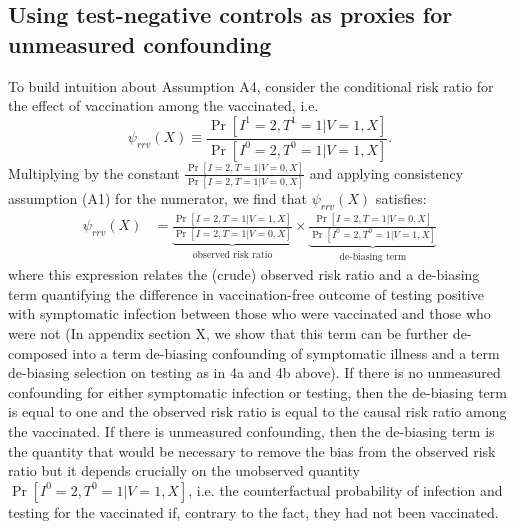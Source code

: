 \documentclass[11pt]{article}
\begin{document}
\subsection{Using test-negative controls as proxies for unmeasured confounding} \label{sec:effect_among_vaccinated}
To build intuition about Assumption A4, consider the conditional risk ratio for the effect of vaccination among the vaccinated, i.e.
\begin{equation*}
    \psi_{rrv}(X) \equiv \frac{\Pr[I^1 = 2, T^1 = 1 | V = 1, X]}{\Pr[I^0 = 2, T^0 = 1 | V = 1, X]}.
\end{equation*}
Multiplying by the constant $\frac{\Pr[I = 2, T = 1 | V = 0, X]}{\Pr[I = 2, T = 1 | V = 0, X]}$ and applying consistency assumption (A1) for the numerator, we find that $\psi_{rrv}(X)$ satisfies:
\begin{align*}
    \psi_{rrv}(X) &=\underbrace{\frac{\Pr[I = 2, T = 1 | V = 1, X]}{\Pr[I = 2, T = 1 | V = 0, X]}}_{\text{observed risk ratio}} \times \underbrace{\frac{\Pr[I = 2, T = 1 | V = 0, X]}{\Pr[I^0 = 2, T^0 = 1 | V = 1, X]}}_{\text{de-biasing term}} 
\end{align*}
where this expression relates the (crude) observed risk ratio and a de-biasing term quantifying the difference in vaccination-free outcome of testing positive with symptomatic infection between those who were vaccinated and those who were not (In appendix section X, we show that this term can be further de-composed into a term de-biasing confounding of symptomatic illness and a term de-biasing selection on testing as in 4a and 4b above). If there is no unmeasured confounding for either symptomatic infection or testing, then the de-biasing term is equal to one and the observed risk ratio is equal to the causal risk ratio among the vaccinated. If there is unmeasured confounding, then the de-biasing term is the quantity that would be necessary to remove the bias from the observed risk ratio but it depends crucially on the unobserved quantity $\Pr[I^0 = 2, T^0 = 1 | V = 1, X]$, i.e. the counterfactual probability of infection and testing for the vaccinated if, contrary to the fact, they had not been vaccinated. 
\end{document}
